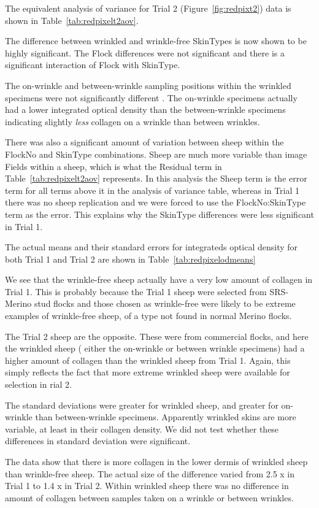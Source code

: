 \documentclass[titlepage]{article}  %
\begin{document}
The equivalent analysis of variance for Trial 2 (Figure~\ref{fig:redpixt2}) data is shown in Table~\ref{tab:redpixelt2aov}.

The difference between wrinkled and wrinkle-free SkinTypes is now shown to be highly significant. The Flock differences were not significant and there is a significant interaction of Flock with SkinType.  

 The on-wrinkle and between-wrinkle sampling positions within the wrinkled specimens were not significantly different . The on-wrinkle specimens actually had a lower integrated optical density than the between-wrinkle specimens indicating slightly {\em less} collagen on a wrinkle than between wrinkles.

There was also a significant amount of variation between sheep within the FlockNo and SkinType combinations. Sheep are much more variable than image Fields within a sheep, which is what the Residual term in Table~\ref{tab:redpixelt2aov} represents. In this analysis the Sheep term is the error term for all terms above it in the analysis of variance table, whereas in Trial 1 there was no sheep replication and we were forced to use the FlockNo:SkinType term as the error. This explains why the SkinType differences were less significant in Trial 1. 

The actual means and their standard errors for integrateds optical density for both Trial 1 and Trial 2 are shown in Table~\ref{tab:redpixelodmeans}

We see that the wrinkle-free sheep actually have a very low amount of collagen in Trial 1. This is probably because the Trial 1 sheep were selected from SRS-Merino stud flocks and those chosen as wrinkle-free were likely to be extreme examples of wrinkle-free sheep, of a type not found in normal Merino flocks. 

The Trial 2 sheep are the opposite. These were from commercial flocks, and here the wrinkled sheep ( either the on-wrinkle or between wrinkle specimens) had a higher amount of collagen than the wrinkled sheep from Trial 1. Again, this simply reflects the fact that more extreme wrinkled sheep were available for selection in rial 2. 

The standard deviations were greater for wrinkled sheep, and greater for on-wrinkle than between-wrinkle specimens. Apparently wrinkled skins are more variable, at least in their collagen density. We did not test whether these differences in standard deviation were significant.

The data show that there is more collagen in the lower dermis of wrinkled sheep than wrinkle-free sheep.  The actual size of the difference varied from 2.5 x in Trial 1 to 1.4 x in Trial 2. 
Within wrinkled sheep there was no difference in amount of collagen between samples taken on a wrinkle or between wrinkles.
\end{document}
